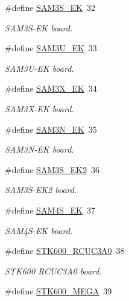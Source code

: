 \begin{DoxyCompactItemize}
\#define \hyperlink{group__group__common__boards_ga35b2c40ce0679c6c73a010aa2c336a18}{S\-A\-M3\-S\-\_\-\-E\-K}~32
\begin{DoxyCompactList}\small\item\em S\-A\-M3\-S-\/\-E\-K board. \end{DoxyCompactList}\item 
\#define \hyperlink{group__group__common__boards_gab5023c1363a78928b59a1c58c9d424b7}{S\-A\-M3\-U\-\_\-\-E\-K}~33
\begin{DoxyCompactList}\small\item\em S\-A\-M3\-U-\/\-E\-K board. \end{DoxyCompactList}\item 
\#define \hyperlink{group__group__common__boards_ga6cb4632f143ec6e1ad2f1f21408a95dc}{S\-A\-M3\-X\-\_\-\-E\-K}~34
\begin{DoxyCompactList}\small\item\em S\-A\-M3\-X-\/\-E\-K board. \end{DoxyCompactList}\item 
\#define \hyperlink{group__group__common__boards_ga817c9dc11525515f03cdadfc14106171}{S\-A\-M3\-N\-\_\-\-E\-K}~35
\begin{DoxyCompactList}\small\item\em S\-A\-M3\-N-\/\-E\-K board. \end{DoxyCompactList}\item 
\#define \hyperlink{group__group__common__boards_gaf6824772f924cd5db7c0539891333187}{S\-A\-M3\-S\-\_\-\-E\-K2}~36
\begin{DoxyCompactList}\small\item\em S\-A\-M3\-S-\/\-E\-K2 board. \end{DoxyCompactList}\item 
\#define \hyperlink{group__group__common__boards_ga3fd374ef815e8306ca25da0ab37e0b79}{S\-A\-M4\-S\-\_\-\-E\-K}~37
\begin{DoxyCompactList}\small\item\em S\-A\-M4\-S-\/\-E\-K board. \end{DoxyCompactList}\item 
\#define \hyperlink{group__group__common__boards_ga138d52c61cc6474466dd4ce92e3c9ed0}{S\-T\-K600\-\_\-\-R\-C\-U\-C3\-A0}~38
\begin{DoxyCompactList}\small\item\em S\-T\-K600 R\-C\-U\-C3\-A0 board. \end{DoxyCompactList}\item 
\#define \hyperlink{group__group__common__boards_ga1d0450ec7f13a095b96372d5142053a5}{S\-T\-K600\-\_\-\-M\-E\-G\-A}~39

\end{DoxyCompactItemize}
